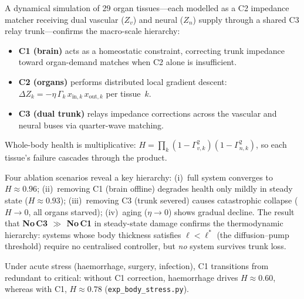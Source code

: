 \documentclass[aps,pre,twocolumn,superscriptaddress,floatfix]{revtex4-2}
\begin{document}
\begin{remark}
\label{rem:body-c123-simulation}
A dynamical simulation of 29 organ tissues---each
modelled as a C2 impedance matcher receiving dual
vascular ($Z_v$) and neural ($Z_n$) supply through
a shared C3 relay trunk---confirms the macro-scale
hierarchy:
\begin{itemize}
  \item \textbf{C1 (brain)} acts as a homeostatic
    constraint, correcting trunk impedance toward
    organ-demand matches when C2 alone is insufficient.
  \item \textbf{C2 (organs)} performs distributed
    local gradient descent:
    $\Delta Z_k = -\eta\,\Gamma_k\,x_{\text{in},k}\,
    x_{\text{out},k}$ per tissue~$k$.
  \item \textbf{C3 (dual trunk)} relays impedance
    corrections across the vascular and neural buses
    via quarter-wave matching.
\end{itemize}
Whole-body health is multiplicative:
$H = \prod_k (1-\Gamma_{v,k}^2)(1-\Gamma_{n,k}^2)$,
so each tissue's failure cascades through the product.

Four ablation scenarios reveal a key hierarchy:
(i)~full system converges to $H \approx 0.96$;
(ii)~removing C1 (brain offline) degrades health only
mildly in steady state ($H \approx 0.93$);
(iii)~removing C3 (trunk severed) causes catastrophic
collapse ($H \to 0$, all organs starved);
(iv)~aging ($\eta \to 0$) shows gradual decline.
The result that \textbf{No\,C3 $\gg$ No\,C1} in
steady-state damage confirms the thermodynamic hierarchy:
systems whose body thickness satisfies $\ell < \ell^*$
(the diffusion--pump threshold) require no centralised
controller, but \emph{no} system survives trunk loss.

Under acute stress (haemorrhage, surgery, infection),
C1 transitions from redundant to critical:
without C1 correction, haemorrhage drives
$H \approx 0.60$, whereas with C1, $H \approx 0.78$
(\texttt{exp\_body\_stress.py}).
\end{remark}
\end{document}

